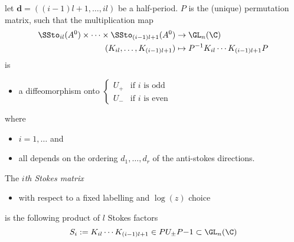 \begin{prop}
  let $\textbf{d}=((i-1)l+1,\dots,il)$ be a half-period.
  $P$ is the (unique) permutation matrix, such that the multiplication map
  \begin{align*}
    \SSto_{il}(A^0)\times\dots\times\SSto_{(i-1)l+1}(A^0)
    &\to \GL_n(\C)
  \\(K_{il},\dots,K_{(i-1)l+1})&\mapsto P^{-1}K_{il}\cdots K_{(i-1)l+1}P
  \end{align*}
  is
  \begin{itemize}
    \item a diffeomorphism onto
      $
      \begin{cases}
        U_+ & \text{if $i$ is odd}
      \\U_- & \text{if $i$ is even}
      \end{cases}
      $
  \end{itemize}
  where
  \begin{itemize}
    \item $i=1,\dots$ and
    \item all depends on the ordering $d_1,\dots,d_r$ of the anti-stokes directions.
  \end{itemize}
  \begin{defn}
    The \emph{$i$th Stokes matrix}
    \begin{itemize}
      \item with respect to a fixed labelling and $\log(z)$ choice
    \end{itemize}
    is the following product of $l$ Stokes factors
    \[
      S_i:=K_{il}\cdots K_{(i-1)l+1}\in PU_{\pm}P{-1}\subset\GL_n(\C)
    \]
  \end{defn}
\end{prop}

